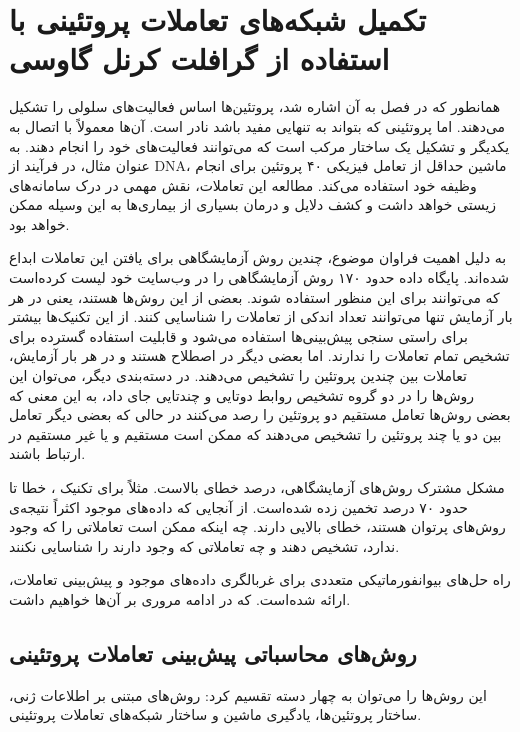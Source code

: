 \chapter{تکمیل شبکه‌های تعاملات پروتئینی با استفاده از گرافلت کرنل گاوسی}\label{chap:network-completion-problem-ppi}
همانطور که در فصل  به آن اشاره شد، پروتئین‌ها اساس فعالیت‌های سلولی را تشکیل می‌دهند. اما پروتئینی که بتواند به تنهایی مفید باشد نادر است. آن‌ها معمولاً با اتصال به یکدیگر و تشکیل یک ساختار مرکب است که می‌توانند فعالیت‌های خود را انجام ‌دهند. به عنوان مثال، در فرآیند  از DNA، ماشین  حداقل از تعامل فیزیکی ۴۰ پروتئین برای انجام وظیفه خود استفاده می‌کند. مطالعه این تعاملات، نقش مهمی در درک سامانه‌های زیستی خواهد داشت و کشف دلایل و درمان بسیاری از بیماری‌ها به این وسیله ممکن خواهد بود.

به دلیل اهمیت فراوان موضوع، چندین روش آزمایشگاهی برای یافتن این تعاملات ابداع شده‌اند. پایگاه داده  حدود ۱۷۰ روش آزمایشگاهی را در وب‌سایت خود لیست کرده‌است که می‌توانند برای این منظور استفاده شوند. بعضی از این روش‌ها  هستند، یعنی در هر بار آزمایش تنها می‌توانند تعداد اندکی از تعاملات را شناسایی کنند. از این تکنیک‌ها بیشتر برای راستی سنجی پیش‌بینی‌ها استفاده می‌شود و قابلیت استفاده گسترده برای تشخیص تمام تعاملات را ندارند. اما بعضی دیگر در اصطلاح  هستند و در هر بار آزمایش، تعاملات بین چندین پروتئین را تشخیص می‌دهند. در دسته‌بندی دیگر، می‌توان این روش‌ها را در دو گروه تشخیص روابط دوتایی و چندتایی جای داد، به این معنی که بعضی روش‌ها تعامل مستقیم دو پروتئین را رصد می‌کنند در حالی که بعضی دیگر تعامل بین دو یا چند پروتئین را تشخیص می‌دهند که ممکن است مستقیم و یا غیر مستقیم در ارتباط باشند.

مشکل مشترک روش‌های آزمایشگاهی، درصد خطای بالاست. مثلاً برای تکنیک ، خطا تا حدود ۷۰ درصد تخمین زده شده‌است. از آنجایی که داده‌های موجود اکثراً نتیجه‌ی روش‌های پرتوان هستند، خطای بالایی دارند. چه اینکه ممکن است تعاملاتی را که وجود ندارد، تشخیص دهند و چه تعاملاتی که وجود دارند را شناسایی نکنند.

راه حل‌های بیوانفورماتیکی متعددی برای غربالگری داده‌های موجود و پیش‌بینی تعاملات، ارائه شده‌است. که در ادامه مروری بر آن‌ها خواهیم داشت.

\section{روش‌های محاسباتی پیش‌بینی تعاملات پروتئینی}
این روش‌ها را می‌توان به چهار دسته تقسیم کرد: روش‌های مبتنی بر اطلاعات ژنی، ساختار پروتئین‌ها، یادگیری ماشین و ساختار شبکه‌های تعاملات پروتئینی.

